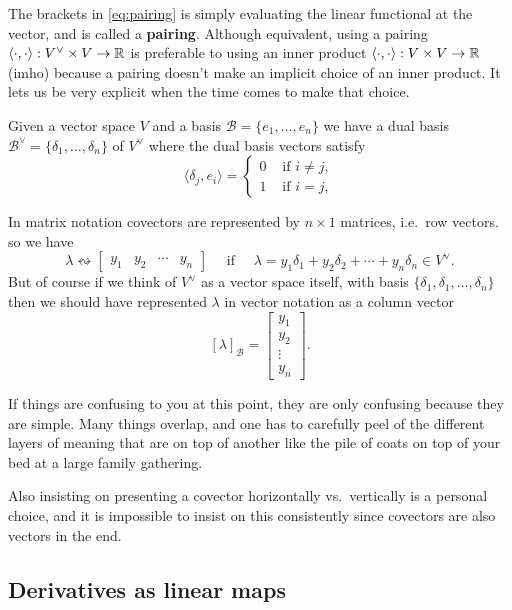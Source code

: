 \documentclass[12pt]{amsart}
\begin{document}
The brackets in \eqref{eq:pairing} is simply evaluating the linear functional at the vector, and is called a {\bf pairing}. Although equivalent, using a pairing $\langle \cdot, \cdot \rangle : V^\vee \times V \to \mathbb{R}$ is preferable to using an inner product $\langle\cdot, \cdot \rangle : V \times V \to \mathbb{R}$ (imho) because a pairing doesn't make an implicit choice of an inner product. It lets us be very explicit when the time comes to make that choice. 

Given a vector space $V$ and a basis $\mathcal{B} = \{e_1, \ldots, e_n\}$ we have a dual basis $\mathcal{B}^\vee = \{\delta_1, \ldots, \delta_n\}$ of $V^\vee$ where the dual basis vectors satisfy
\[
	\langle \delta_j, e_i \rangle = \begin{cases} 0 & \text{ if } i \neq j, \\
	1 &\text{ if }  i = j, \end{cases}
\]

In matrix notation covectors are represented by $n\times 1$ matrices, i.e.\ row vectors. so we have
\[
	\lambda  \leftrightsquigarrow \begin{bmatrix} y_1 & y_2 & \cdots & y_n \end{bmatrix} \quad \text{ if } \quad \lambda = y_1 \delta_1 + y_2 \delta_2 + \cdots + y_n \delta_n \in V^\vee.
\] 
But of course if we think of $V^\vee$ as a vector space itself, with basis $\{\delta_1, \delta_1, \ldots, \delta_n\}$ then we should have represented $\lambda$ in vector notation as a column vector
\[
	[\lambda]_{\mathcal{B}} = \begin{bmatrix} y_1 \\ y_2 \\ \vdots \\ y_n \end{bmatrix}.
\]

If things are confusing to you at this point, they are only confusing because they are simple. Many things overlap, and one has to carefully peel of the different layers of meaning that are on top of another like the pile of coats on top of your bed at a large family gathering.

Also insisting on presenting a covector horizontally vs.\ vertically is a personal choice, and it is impossible to insist on this consistently since covectors are also vectors in the end. 

\subsection*{Derivatives as linear maps}
\end{document}
